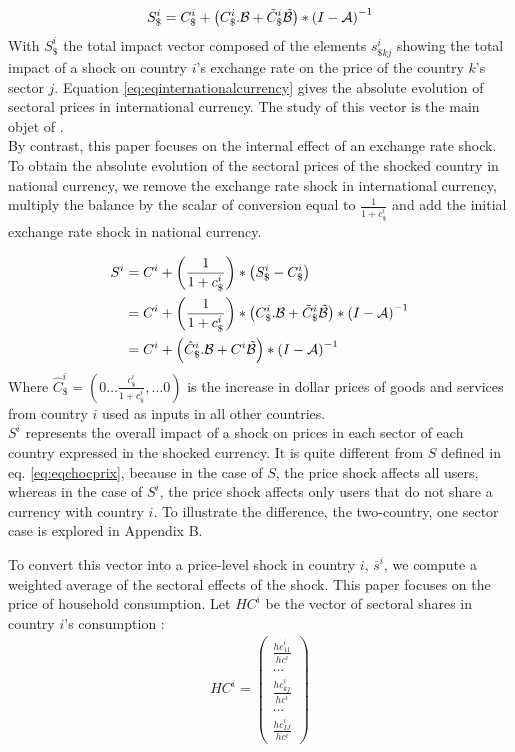 \documentclass[11pt,a4paper]{article}
\begin{document}
 
 \begin{eqnarray}
S_\$^i=C_\$^i+\left(C_\$^i.{\cal B}+{\tilde{C}_\$^i}{\tilde{{\cal B}}}\right)*{{(I-{\cal A})}^{-1}}	
\label{eq:eqinternationalcurrency}
 \end{eqnarray}
With $S_\$^i$ the total impact vector composed of the elements ${{{s}}^i_{\$kj}}$ showing the total impact of a shock on country $i$'s exchange rate on the price of the country $k$'s sector $j$. 
Equation \ref{eq:eqinternationalcurrency} gives the absolute evolution of sectoral prices in international currency. The study of this vector is the main objet of \cite{Cochard2016}.\\

By contrast, this paper focuses on the internal effect of an exchange rate shock. To obtain the absolute evolution of the sectoral prices of the shocked country in national currency, we remove the exchange rate shock in international currency, multiply the balance by the scalar of conversion equal to $\frac{1}{1+c_\$^i}$ and add the initial exchange rate shock in national currency.

\begin{equation}
\begin{aligned}
	S^i&=C^i  + \left( \frac{1}{1+{{c}_\$^i}}\right)*\left({S_\$^i}-{{C}_{\$}^i}\right)\\
	&=C^i + \left( \frac{1}{1+{{c}_\$^i}}\right)*\left(C_\$^i.{\cal B}+{\tilde{C}_\$^i}{\tilde{{\cal B}}}\right)*{{(I-{\cal A})}^{-1}} 	\\
	&=C^i	+ \left(\hat{C}^i_\$.{\cal B}+{C^i}{\tilde{{\cal B}}}\right)*{{(I-{\cal A})}^{-1}}	
\label{eq:eqdomcurrency}
\end{aligned}
\end{equation}
Where $\hat{C}^i_\$=\left(0 \ldots \frac{c_\$^i}{1+c_\$^i},\ldots 0 \right)$ is the increase in dollar prices of goods and services from country $i$ used as inputs in all other countries.\\ 
$S^i$ represents the overall impact of a shock on prices in each sector of each country expressed in the shocked currency.
It is quite different from $S$ defined in eq. \eqref{eq:eqchocprix}, because in the case of $S$, the price shock affects all users, whereas in the case of $S^i$, the price shock affects only users that do not share a currency with country $i$. 
To illustrate the difference, the two-country, one sector case is explored in Appendix B.

To convert this vector into a price-level shock in country $i$, $\bar{s}^i$, we compute a weighted average of the sectoral effects of the shock. 
This paper focuses on the price of household consumption. Let $HC^i$ be the vector of sectoral shares in country $i$'s consumption :
\begin{eqnarray*}
HC^i=\left( 
	\begin{array}{c}
	\frac{{hc}_{11}^i}{hc^i} \\
	...\\
	\frac{{hc}_{kj}^i}{hc^i}\\
	...\\
	\frac{{hc}_{IJ}^i}{hc^i}
	 \end{array}
	 \right)
\end{eqnarray*}
\end{document}
